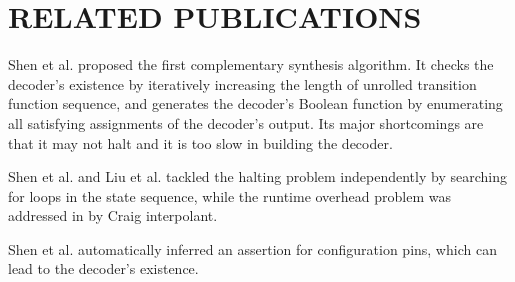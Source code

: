 \documentclass[conference]{IEEEtran}
\begin{document}
 















\section{RELATED PUBLICATIONS}\label{sec_relwork}
%
%

Shen et al.\cite{ShenICCAD09} proposed the first complementary synthesis algorithm.
It checks the decoder's existence by iteratively increasing the length of unrolled transition function sequence,
and generates the decoder's Boolean function by enumerating all satisfying assignments of the decoder's output.
Its major shortcomings are that it may not halt and it is too slow
in building the decoder.

Shen et al.\cite{ShenTCAD11} and Liu et al.\cite{LiuICCAD11} tackled the halting problem independently by searching for loops in the state sequence,
while the runtime overhead problem was addressed in \cite{ShenTCAD12,LiuICCAD11} by Craig interpolant\cite{Craig}.

Shen et al.\cite{ShenTCAD12} automatically inferred an assertion for configuration pins, 
which can lead to the decoder's existence.
\end{document}

